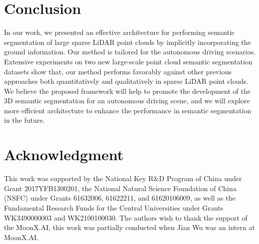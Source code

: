 \documentclass{sip}%
\begin{document}
\section{Conclusion}
In our work, we presented an effective architecture for performing semantic segmentation of large sparse LiDAR point clouds by implicitly incorporating the ground information. 
Our method is tailored for the autonomous driving scenarios. Extensive experiments on two new large-scale point cloud semantic segmentation datasets show that, our method performs favorably against other previous approaches both quantitatively and qualitatively in sparse LiDAR point clouds.
We believe the proposed framework will help to promote the development of the 3D semantic segmentation for an autonomous driving scene, and we will explore more efficient architecture to enhance the performance in semantic segmentation in the future.



\section*{Acknowledgment}
This work was supported by the National Key R$\&$D Program of China under Grant 2017YFB1300201, the National Natural Science Foundation of China (NSFC) under Grants 61632006, 61622211, and 61620106009, as well as the Fundamental Research Funds for the Central Universities under Grants WK3490000003 and WK2100100030. The authors wish to thank the support of the MoonX.AI, this work was partially conducted when Jian Wu was an intern at MoonX.AI.



\end{document}
